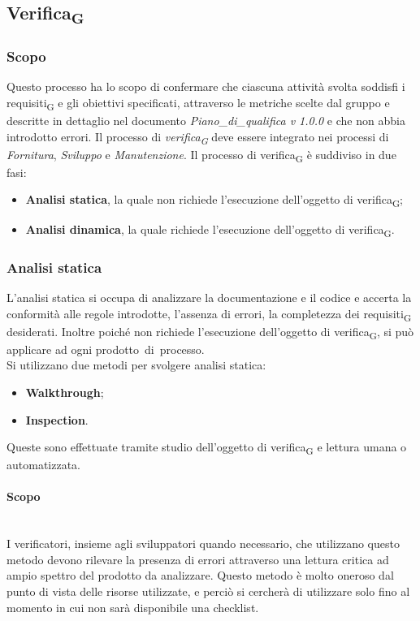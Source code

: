 \subsection{Verifica\textsubscript{G}}
\subsubsection{Scopo}
Questo processo ha lo scopo di confermare che ciascuna attività svolta soddisfi i requisiti\textsubscript{G} e gli obiettivi specificati, attraverso le metriche scelte dal gruppo e descritte in dettaglio nel documento \textit{Piano\_di\_qualifica v 1.0.0} e che non abbia introdotto errori.
Il processo di \textit{verifica\textsubscript{G}} deve essere integrato nei processi di \textit{Fornitura}, \textit{Sviluppo} e \textit{Manutenzione}.
\newline
\newline
Il processo di verifica\textsubscript{G} è suddiviso in due fasi:
\begin{itemize}
	\item \textbf{Analisi statica}, la quale non richiede l'esecuzione dell'oggetto di verifica\textsubscript{G};
	\item \textbf{Analisi dinamica}, la quale richiede l'esecuzione dell'oggetto di verifica\textsubscript{G}.
\end{itemize}

\subsubsection{Analisi statica}
L’analisi statica si occupa di analizzare la documentazione e il codice e accerta la conformità alle regole introdotte, l'assenza di errori, la completezza dei requisiti\textsubscript{G} desiderati. Inoltre poiché non richiede l’esecuzione dell’oggetto di verifica\textsubscript{G}, si può applicare ad ogni prodotto di processo.\\
Si utilizzano due metodi per svolgere analisi statica:
\begin{itemize}
	\item \textbf{Walkthrough};
	\item \textbf{Inspection}.
\end{itemize}
Queste sono effettuate tramite studio dell’oggetto di verifica\textsubscript{G} e lettura umana o automatizzata.
\paragraph {Scopo}\mbox{}\\
I verificatori, insieme agli sviluppatori quando necessario, che utilizzano questo metodo devono rilevare la presenza di errori attraverso una lettura critica ad ampio spettro del prodotto da analizzare. Questo metodo è molto oneroso dal punto di vista delle risorse utilizzate, e perciò si cercherà di utilizzare solo fino al momento in cui non sarà disponibile una checklist.
